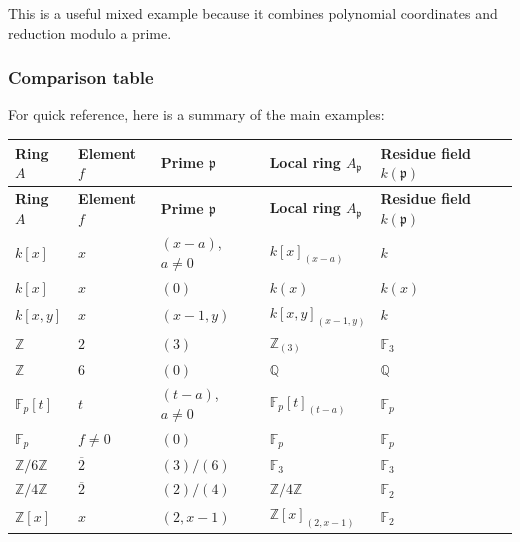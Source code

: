 \documentclass[12pt,a4paper]{article}
\theoremstyle{notespace}
\newcommand{\mf}{\mathfrak}
\theoremstyle{definition}
\begin{document}
This is a useful mixed example because it combines polynomial coordinates and reduction modulo a prime.

\subsubsection{Comparison table}

For quick reference, here is a summary of the main examples:

\begin{center}
	\renewcommand{\arraystretch}{1.35}
	\begin{longtable}{>{\raggedright\arraybackslash}p{}
			>{\raggedright\arraybackslash}p{}
			>{\raggedright\arraybackslash}p{}
			>{\raggedright\arraybackslash}p{}
			>{\raggedright\arraybackslash}p{}}
		\toprule
		\textbf{Ring \(A\)} & \textbf{Element \(f\)} & \textbf{Prime \(\mf p\)} & \textbf{Local ring \(A_{\mf p}\)} & \textbf{Residue field \(k(\mf p)\)} \\
		\midrule
		\endfirsthead
		
		\toprule
		\textbf{Ring \(A\)} & \textbf{Element \(f\)} & \textbf{Prime \(\mf p\)} & \textbf{Local ring \(A_{\mf p}\)} & \textbf{Residue field \(k(\mf p)\)} \\
		\midrule
		\endhead
		
		\bottomrule
		\endfoot
		
		\(k[x]\) & \(x\) & \((x-a)\), \(a\neq 0\) & \(k[x]_{(x-a)}\) & \(k\) \\
		\(k[x]\) & \(x\) & \((0)\) & \(k(x)\) & \(k(x)\) \\
		\(k[x,y]\) & \(x\) & \((x-1,y)\) & \(k[x,y]_{(x-1,y)}\) & \(k\) \\
		\(\mathbb Z\) & \(2\) & \((3)\) & \(\mathbb Z_{(3)}\) & \(\mathbb F_3\) \\
		\(\mathbb Z\) & \(6\) & \((0)\) & \(\mathbb Q\) & \(\mathbb Q\) \\
		\(\mathbb F_p[t]\) & \(t\) & \((t-a)\), \(a\neq 0\) & \(\mathbb F_p[t]_{(t-a)}\) & \(\mathbb F_p\) \\
		\(\mathbb F_p\) & \(f\neq 0\) & \((0)\) & \(\mathbb F_p\) & \(\mathbb F_p\) \\
		\(\mathbb Z/6\mathbb Z\) & \(\overline{2}\) & \((3)/(6)\) & \(\mathbb F_3\) & \(\mathbb F_3\) \\
		\(\mathbb Z/4\mathbb Z\) & \(\overline{2}\) & \((2)/(4)\) & \(\mathbb Z/4\mathbb Z\) & \(\mathbb F_2\) \\
		\(\mathbb Z[x]\) & \(x\) & \((2,x-1)\) & \(\mathbb Z[x]_{(2,x-1)}\) & \(\mathbb F_2\) \\
	\end{longtable}
\end{center}
\end{document}
